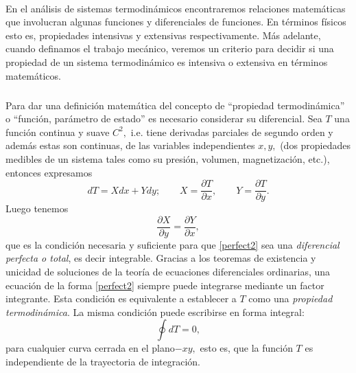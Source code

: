 \documentclass{article}
\theoremstyle{definition} \newtheorem{defi}{Definici\'on}
\theoremstyle{definition} \newtheorem{teo}{Teorema}
\theoremstyle{definition} \newtheorem{cor}{Corolario}
\begin{document}
\paragraph{}
En el an\'alisis de sistemas termodin\'amicos encontraremos relaciones matem\'aticas que involucran algunas funciones y diferenciales de funciones. En t\'erminos f\'isicos esto es, propiedades intensivas y extensivas respectivamente. M\'as adelante, cuando definamos el trabajo mec\'anico, veremos un criterio para decidir si una propiedad de un sistema termodin\'amico es intensiva o extensiva en t\'erminos matem\'aticos.
\subparagraph{}
Para dar una definici\'on matem\'atica del concepto de ``propiedad termodin\'amica'' o ``funci\'on, par\'ametro de estado'' es necesario considerar su diferencial. Sea $T$ una funci\'on continua y suave $C^2,$ i.e. tiene derivadas parciales de segundo orden y adem\'as estas son continuas, de las variables independientes $x, y,$ (dos propiedades medibles de un sistema tales como su presi\'on, volumen, magnetizaci\'on, etc.), entonces expresamos
\begin{equation} \label{perfect2}
dT=Xdx+Ydy; \qquad X= \frac{\partial T}{\partial x}, \qquad Y= \frac{\partial T}{\partial y}.
\end{equation}
Luego tenemos
\begin{equation}\label{mixed}
\frac{\partial X}{\partial y}=\frac{\partial Y}{\partial x},
\end{equation}
que es la condici\'on necesaria y suficiente para que \eqref{perfect2} sea una \emph{diferencial perfecta o total}, es decir integrable. Gracias a los teoremas de existencia y unicidad de soluciones de la teor\'ia de ecuaciones diferenciales ordinarias, una ecuaci\'on de la forma \eqref{perfect2} siempre puede integrarse mediante un factor integrante. Esta condici\'on es equivalente a establecer a $T$ como una \emph{propiedad termodin\'amica}. La misma condici\'on puede escribirse en forma integral:
\begin{equation}\label{stotal}
\oint dT=0,
\end{equation}
para cualquier curva cerrada en el plano$-xy,$ esto es, que la funci\'on $T$ es independiente de la trayectoria de integraci\'on.
\end{document}
